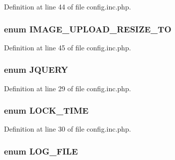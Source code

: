 Definition at line 44 of file config.inc.php.

\hypertarget{config_8inc_8php_a86484d4f8051155268e7c23ac4d1f5f4}{
\subsubsection[{IMAGE\_\-UPLOAD\_\-RESIZE\_\-TO}]{\setlength{\rightskip}{0pt plus 5cm}enum {\bf IMAGE\_\-UPLOAD\_\-RESIZE\_\-TO}}}
\label{config_8inc_8php_a86484d4f8051155268e7c23ac4d1f5f4}


Definition at line 45 of file config.inc.php.

\hypertarget{config_8inc_8php_a5c2fff7e41a0380fb7872627e3a14a29}{
\subsubsection[{JQUERY}]{\setlength{\rightskip}{0pt plus 5cm}enum {\bf JQUERY}}}
\label{config_8inc_8php_a5c2fff7e41a0380fb7872627e3a14a29}


Definition at line 29 of file config.inc.php.

\hypertarget{config_8inc_8php_a924ae40271cc363050158e36b3823407}{
\subsubsection[{LOCK\_\-TIME}]{\setlength{\rightskip}{0pt plus 5cm}enum {\bf LOCK\_\-TIME}}}
\label{config_8inc_8php_a924ae40271cc363050158e36b3823407}


Definition at line 30 of file config.inc.php.

\hypertarget{config_8inc_8php_a6de83433b64b24349644a4c2d839dcb7}{
\subsubsection[{LOG\_\-FILE}]{\setlength{\rightskip}{0pt plus 5cm}enum {\bf LOG\_\-FILE}}}
\label{config_8inc_8php_a6de83433b64b24349644a4c2d839dcb7}


